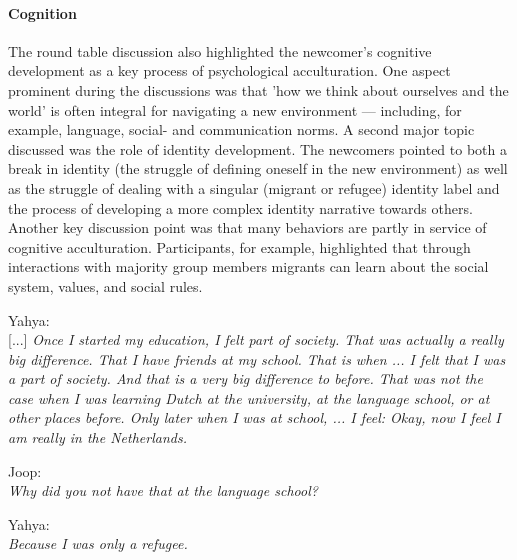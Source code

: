 \documentclass[nobib]{tufte-handout}
\begin{document}
\paragraph{Cognition} The round table discussion also highlighted the newcomer’s cognitive development as a key process of psychological acculturation. One aspect prominent during the discussions was that 'how we think about ourselves and the world' is often integral for navigating a new environment --- including, for example, language, social- and communication norms. A second major topic discussed was the role of identity development. The newcomers pointed to both a break in identity (the struggle of defining oneself in the new environment) as well as the struggle of dealing with a singular (migrant or refugee) identity label and the process of developing a more complex identity narrative towards others. Another key discussion point was that many behaviors are partly in service of cognitive acculturation. Participants, for example, highlighted that through interactions with majority group members migrants can learn about the social system, values, and social rules.
\begin{displayquote}
    Yahya:\\
    {[...]} \textit{Once I started my education, I felt part of society. That was actually a really big difference. That I have friends at my school. That is when ... I felt that I was a part of society. And that is a very big difference to before. That was not the case when I was learning Dutch at the university, at the language school, or at other places before. Only later when I was at school, ... I feel: Okay, now I feel I am really in the Netherlands.}
    
    Joop:\\
    \textit{Why did you not have that at the language school?}
    
    Yahya:\\
    \textit{Because I was only a refugee.}
\end{displayquote}
\end{document}
